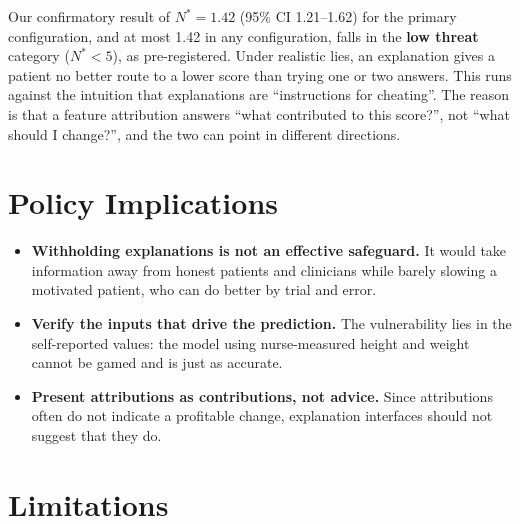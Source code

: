 \documentclass[12pt, a4paper, oneside]{report}
\theoremstyle{definition}
\begin{document}
Our confirmatory result of $N^* = 1.42$ (95\% CI 1.21--1.62) for the
primary configuration, and at most 1.42 in any configuration, falls in
the \textbf{low threat} category ($N^* < 5$), as pre-registered. Under
realistic lies, an explanation gives a patient no better route to a
lower score than trying one or two answers. This runs against the intuition that explanations are
``instructions for cheating''. The reason is that a feature attribution
answers ``what contributed to this score?'', not ``what should I
change?'', and the two can point in different directions.

\section{Policy Implications}

\begin{itemize}
  \item \textbf{Withholding explanations is not an effective safeguard.}
        It would take information away from honest patients and
        clinicians while barely slowing a motivated patient, who can
        do better by trial and error.
  \item \textbf{Verify the inputs that drive the prediction.} The
        vulnerability lies in the self-reported values: the model
        using nurse-measured height and weight cannot be gamed and is
        just as accurate.
  \item \textbf{Present attributions as contributions, not advice.}
        Since attributions often do not indicate a profitable change,
        explanation interfaces should not suggest that they do.
\end{itemize}

\section{Limitations}
\end{document}
